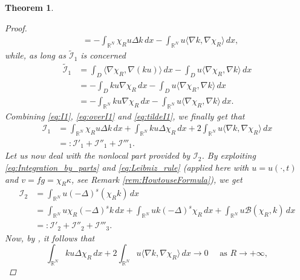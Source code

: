 \documentclass[11pt,a4paper,reqno]{amsart}
\theoremstyle{definition}
\theoremstyle{plain}
\newtheorem{theorem}[definition]{Theorem}
\numberwithin{equation}{section}
\begin{document}
\begin{theorem}
\begin{proof}
\begin{equation}
\begin{aligned}
		&= -\int_{\mathbb{R}^{N}}\chi_{R}u \Delta k \, dx -  \int_{\mathbb{R}^{N}}u\langle \nabla k, \nabla \chi_{R}\rangle \, dx,
	\end{aligned}
\end{equation}
\noindent while, as long as $\widetilde{\mathcal{I}}_{1}$ is concerned
\begin{equation}\label{eq:tildeI1}
	\begin{aligned}
		\widetilde{\mathcal{I}}_{1} &= \int_{D}\langle \nabla \chi_R, \nabla (ku)\rangle \, dx - \int_{D}u \langle \nabla \chi_{R},\nabla k\rangle \, dx\\
		&= - \int_{D}ku \nabla \chi_{R} \, dx - \int_{D}u \langle \nabla \chi_{R},\nabla k\rangle \, dx\\
		&= - \int_{\mathbb{R}^{N}}ku \nabla \chi_{R} \, dx - \int_{\mathbb{R}^{N}}u \langle \nabla \chi_{R},\nabla k\rangle \, dx.
	\end{aligned}
\end{equation}
Combining \eqref{eq:I1}, \eqref{eq:overI1} and \eqref{eq:tildeI1}, we finally get that
\begin{equation*}
	\begin{aligned}
	\mathcal{I}_{1} &= \int_{\mathbb{R}^{N}}\chi_{R}u\Delta k \, dx + \int_{\mathbb{R}^N}k u \Delta \chi_{R} \, dx + 2\int_{\mathbb{R}^{N}}u \langle \nabla k, \nabla \chi_{R}\rangle \, dx\\
	&=:\mathcal{I}'_{1} + \mathcal{I}''_{1} +  \mathcal{I}'''_{1}.
	\end{aligned}
\end{equation*}
Let us now deal with the nonlocal part provided by $\mathcal{I}_2$. By exploiting \eqref{eq:Integration_by_parts} and \eqref{eq:Leibniz_rule} (applied here with $u = u(\cdot,t)$ and $v = fg = \chi_R\kappa$, see Remark
\ref{rem:HowtouseFormula}),  we get
\begin{equation*}
	\begin{aligned}
		\mathcal{I}_{2} &= \int_{\mathbb{R}^{N}}u (-\Delta)^s(\chi_{R}k)\, dx \\
		&= \int_{\mathbb{R}^{N}}u \chi_R (-\Delta)^{s}k \, dx + \int_{\mathbb{R}^{N}}uk (-\Delta)^s \chi_{R}\, dx + \int_{\mathbb{R}^{N}}u\mathcal{B}(\chi_{R},k)\, dx\\
		&=: \mathcal{I}'_{2} + \mathcal{I}''_{2}+ \mathcal{I}'''_{3}.
	\end{aligned}
\end{equation*}
Now, by \cite[Lemma 3.2]{BMP}, it follows that
\begin{equation}\label{eq:Limite_locale}
	\int_{\mathbb{R}^N}k u \Delta \chi_{R} \, dx + 2\int_{\mathbb{R}^{N}}u \langle \nabla k, \nabla \chi_{R}\rangle \, dx \to 0 \quad \textrm{ as } R \to +\infty,

\end{equation}
\end{proof}
\end{theorem}
\end{document}
